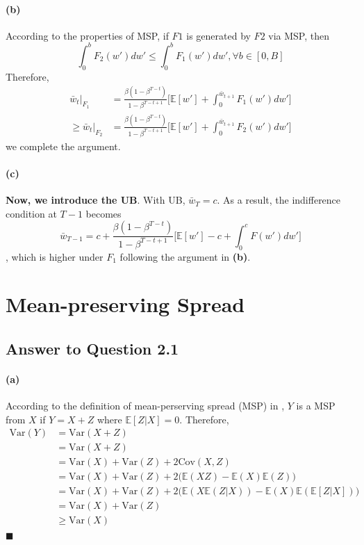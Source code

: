 \documentclass[11pt]{article}
\theoremstyle{definition}
\theoremstyle{boldtitle} %
\numberwithin{equation}{section}
\numberwithin{figure}{section}
\numberwithin{table}{section}
\begin{document}
\paragraph{(b)}
According to the properties of MSP, if $F1$ is generated by $F2$ via MSP, then
\[
\int_0^b F_2(w') dw' \leq \int_0^b F_1(w') dw', \forall b \in [0, B]
\]
Therefore,
\begin{align*}
\bar{w}_t|_{F_1} & = \frac{\beta (1 -\beta^{T-t})}{1 - \beta^{T-t+1}} \bigg[ \mathbb{E}[w'] + \int_{0}^{\bar{w}_{t+1}}F_1(w')dw' \bigg] \\
\geq \bar{w}_t|_{F_2} & = \frac{\beta (1 -\beta^{T-t})}{1 - \beta^{T-t+1}} \bigg[ \mathbb{E}[w'] + \int_{0}^{\bar{w}_{t+1}}F_2(w')dw' \bigg]
\end{align*}
we complete the argument.


\paragraph{(c)}
\textbf{Now, we introduce the UB}.
With UB, $\bar{w}_T = c$.
As a result, the indifference condition at $T-1$ becomes 
\[
\bar{w}_{T-1} = c + \frac{\beta (1 -\beta^{T-t})}{1 - \beta^{T-t+1}} \bigg[ \mathbb{E}[w'] - c + \int_{0}^{c}F(w')dw' \bigg]
\],
which is higher under $F_1$ following the argument in \textbf{(b)}.

\section{Mean-preserving Spread}
\subsection{Answer to Question 2.1}
\paragraph{(a)}
According to the definition of mean-perserving spread (MSP) in \cite{Rothschild:1978},
$Y$ is a MSP from $X$ if $Y = X + Z$ where $\mathbb{E}[Z|X] = 0$.
Therefore, 
\begin{align*}
  \text{Var}(Y) & = \text{Var}(X + Z) \\ 
  & = \text{Var}(X + Z) \\
  & = \text{Var}(X) + \text{Var}(Z) + 2 \text{Cov}(X, Z) \\
  & = \text{Var}(X) + \text{Var}(Z) + 2 \bigg(\mathbb{E}(XZ) - \mathbb{E}(X) \mathbb{E}(Z)\bigg) \\
  & = \text{Var}(X) + \text{Var}(Z) + 2 \bigg(\mathbb{E}(X\mathbb{E}(Z|X)) - \mathbb{E}(X) \mathbb{E}(\mathbb{E}[Z|X])\bigg) \\
  & = \text{Var}(X) + \text{Var}(Z) \\
  & \geq \text{Var}(X)
\end{align*}
\(\blacksquare\)
\end{document}
